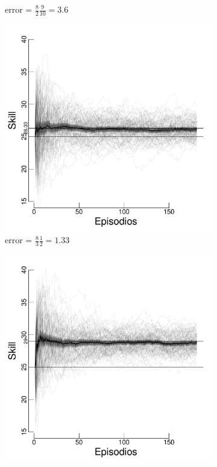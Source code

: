 \documentclass[a4paper,11pt]{book}
\theoremstyle{definition}
\begin{document}
\begin{figure}[H]
\begin{subfigure}[t]{0.32\textwidth}
  \caption{\scriptsize error = $\frac{8}{2}\frac{9}{10} = 3.6$}\label{F6}
  \end{subfigure}
  \begin{subfigure}[t]{0.32\textwidth}
  \includegraphics[page=1,width=\textwidth]{static/truesynergy/expF7.pdf}
  \caption{\scriptsize error = $\frac{8}{3}\frac{1}{2} = 1.33$}\label{F7}
  \end{subfigure}
  \begin{subfigure}[t]{0.32\textwidth}
  \includegraphics[page=1,width=\textwidth]{static/truesynergy/expF8.pdf}

\end{subfigure}
\end{figure}
\end{document}
